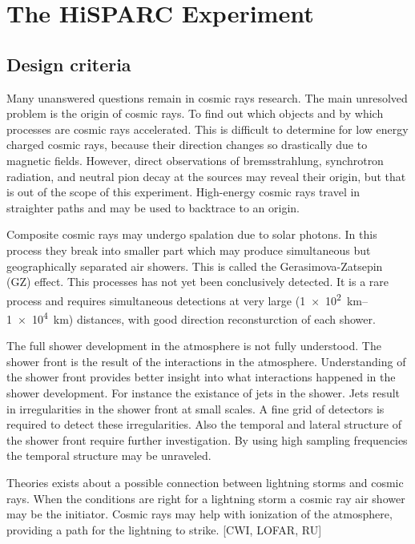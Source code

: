 \chapter{The HiSPARC Experiment}

\section{Design criteria}

Many unanswered questions remain in cosmic rays research. The main unresolved problem is the origin of cosmic rays. To find out which objects and by which processes are cosmic rays accelerated. This is difficult to determine for low energy charged cosmic rays, because their direction changes so drastically due to magnetic fields. However, direct observations of bremsstrahlung, synchrotron radiation, and neutral pion decay at the sources may reveal their origin, but that is out of the scope of this experiment. High-energy cosmic rays travel in straighter paths and may be used to backtrace to an origin.

Composite cosmic rays may undergo spalation due to solar photons. In this process they break into smaller part which may produce simultaneous but geographically separated air showers. This is called the Gerasimova-Zatsepin (GZ) effect. This processes has not yet been conclusively detected. It is a rare process and requires simultaneous detections at very large (\SIrange{1e2}{1e4}{\kilo\meter}) distances, with good direction reconsturction of each shower.

The full shower development in the atmosphere is not fully understood. The shower front is the result of the interactions in the atmosphere. Understanding of the shower front provides better insight into what interactions happened in the shower development. For instance the existance of jets in the shower. Jets result in irregularities in the shower front at small scales. A fine grid of detectors is required to detect these irregularities. Also the temporal and lateral structure of the shower front require further investigation. By using high sampling frequencies the temporal structure may be unraveled.

Theories exists about a possible connection between lightning storms and cosmic rays. When the conditions are right for a lightning storm a cosmic ray air shower may be the initiator. Cosmic rays may help with ionization of the atmosphere, providing a path for the lightning to strike. [CWI, LOFAR, RU]

